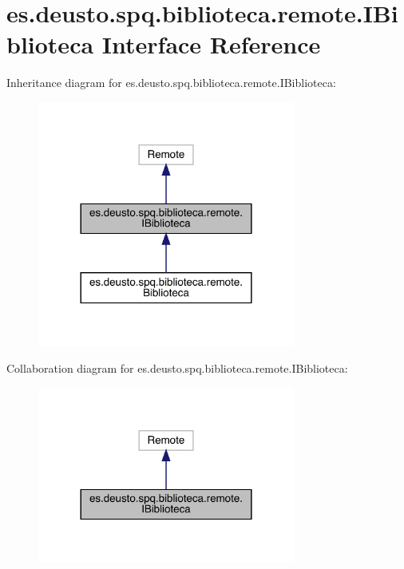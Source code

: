 \hypertarget{interfacees_1_1deusto_1_1spq_1_1biblioteca_1_1remote_1_1_i_biblioteca}{}\section{es.\+deusto.\+spq.\+biblioteca.\+remote.\+I\+Biblioteca Interface Reference}
\label{interfacees_1_1deusto_1_1spq_1_1biblioteca_1_1remote_1_1_i_biblioteca}


Inheritance diagram for es.\+deusto.\+spq.\+biblioteca.\+remote.\+I\+Biblioteca\+:
\nopagebreak
\begin{figure}[H]
\begin{center}
\leavevmode
\includegraphics[width=240pt]{interfacees_1_1deusto_1_1spq_1_1biblioteca_1_1remote_1_1_i_biblioteca__inherit__graph}
\end{center}
\end{figure}


Collaboration diagram for es.\+deusto.\+spq.\+biblioteca.\+remote.\+I\+Biblioteca\+:
\nopagebreak
\begin{figure}[H]
\begin{center}
\leavevmode
\includegraphics[width=240pt]{interfacees_1_1deusto_1_1spq_1_1biblioteca_1_1remote_1_1_i_biblioteca__coll__graph}
\end{center}
\end{figure}
